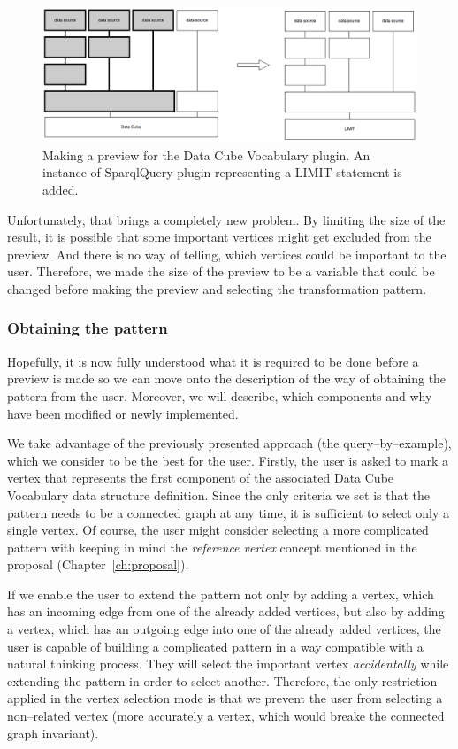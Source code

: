 \begin{figure}
	\centering
	\includegraphics[width=140mm]{img/dcv-extraction-limit.png}
	\caption{Making a preview for the Data Cube Vocabulary plugin. An instance of
	SparqlQuery plugin representing a LIMIT statement is added.}
	\label{fig:dcv-extraction-limit}
\end{figure}

Unfortunately, that brings a completely new problem. By limiting the size of 
the result, it is possible that some important vertices might get excluded from the preview.
And there is no way of 
telling, which vertices could be important to the user. Therefore, we made the 
size of the preview to be a variable that could be changed before making the preview and 
selecting the transformation pattern.



\subsubsection{Obtaining the pattern}
Hopefully, it is now fully understood what it is required to be done before a preview 
is made so we can move onto the description of the way of obtaining the pattern 
from the user. Moreover, we will describe, which components and why have been 
modified or newly implemented.

We take advantage of the previously presented approach (the query--by--example), which we 
consider to be the best for the user. Firstly, the user is asked to mark a vertex that represents
the first component of the associated Data Cube Vocabulary data structure 
definition. Since the only criteria we set is that the pattern needs to be a 
connected graph at any time, it is sufficient to select only a single vertex.
Of course, the user might consider selecting a more complicated pattern with keeping in mind the 
\emph{reference vertex} concept mentioned in the proposal (Chapter~\ref{ch:proposal}).

If we enable the user to extend the pattern not only by adding a vertex, 
which has an incoming edge from one of the already added vertices, but also by adding 
a vertex, which has an outgoing edge into one of the already added vertices, 
the user is capable of building a complicated pattern in a way compatible with a natural thinking process.
They will select the
important vertex \emph{accidentally} while extending the 
pattern in order to select another. Therefore, the only restriction 
applied in the vertex selection mode is that we prevent the user from selecting 
a non--related vertex (more accurately a vertex, which would breake the connected 
graph invariant).

